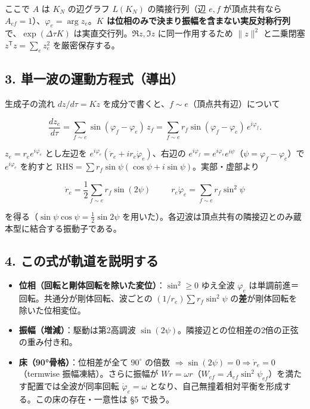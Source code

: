 \documentclass[
  a4paper,
]{ltjsarticle}
\providecommand{\tightlist}{%
  \setlength{\itemsep}{0pt}\setlength{\parskip}{0pt}}
\begin{document}
ここで \(A\) は \(K_N\) の辺グラフ \(L(K_N)\) の隣接行列（辺 \(e,f\)
が頂点共有なら \(A_{ef}=1\)）、\(\varphi_e=\arg z_e\)。\textbf{\(K\)
は位相のみで決まり振幅を含まない実反対称行列}で、\(\exp(\Delta\tau K)\)
は実直交行列。\(\Re z,\Im z\) に同一作用するため \(\|z\|^2\) と二乗閉塞
\(z^{\mathsf T}z=\sum_e z_e^2\) を厳密保存する。

\subsection{3.
単一波の運動方程式（導出）}\label{ux5358ux4e00ux6ce2ux306eux904bux52d5ux65b9ux7a0bux5f0fux5c0eux51fa}

生成子の流れ \(dz/d\tau=Kz\)
を成分で書くと、\(f\sim e\)（頂点共有辺）について

\[\frac{dz_e}{d\tau}=\sum_{f\sim e}\sin(\varphi_f-\varphi_e)\,z_f=\sum_{f\sim e}r_f\sin(\varphi_f-\varphi_e)\,e^{i\varphi_f}.\]

\(z_e=r_e e^{i\varphi_e}\) とし左辺を
\(e^{i\varphi_e}(\dot r_e+ir_e\dot\varphi_e)\)、右辺の
\(e^{i\varphi_f}=e^{i\varphi_e}e^{i\psi}\)（\(\psi=\varphi_f-\varphi_e\)）で
\(e^{i\varphi_e}\) を約すと
\(\text{RHS}=\sum r_f\sin\psi(\cos\psi+i\sin\psi)\)。実部・虚部より

\[\boxed{\ \dot r_e=\frac12\sum_{f\sim e}r_f\sin(2\psi)\ }\qquad\boxed{\ r_e\dot\varphi_e=\sum_{f\sim e}r_f\sin^2\psi\ }\]

を得る（\(\sin\psi\cos\psi=\tfrac12\sin2\psi\)
を用いた）。各辺波は頂点共有の隣接辺とのみ蔵本型に結合する振動子である。

\subsection{4.
この式が軌道を説明する}\label{ux3053ux306eux5f0fux304cux8eccux9053ux3092ux8aacux660eux3059ux308b}

\begin{itemize}
\tightlist
\item
  \textbf{位相（回転と剛体回転を除いた変位）}：\(\sin^2\ge0\) ゆえ全波
  \(\varphi_e\) は単調前進＝回転。共通分が剛体回転、波ごとの
  \((1/r_e)\sum r_f\sin^2\psi\)
  の\textbf{差}が剛体回転を除いた位相変位。
\item
  \textbf{振幅（増減）}：駆動は第2高調波
  \(\sin(2\psi)\)。隣接辺との位相差の2倍の正弦の重み付き和。
\item
  \textbf{床（90°骨格）}：位相差が全て \(90^\circ\) の倍数
  \(\Rightarrow\sin(2\psi)=0\Rightarrow\dot r_e=0\)（termwise
  振幅凍結）。さらに振幅が
  \(Wr=\omega r\)（\(W_{ef}=A_{ef}\sin^2\psi_{ef}\)）を満たす配置では全波が同率回転
  \(\dot\varphi_e=\omega\)
  となり、自己無撞着相対平衡を形成する。この床の存在・一意性は §5
  で扱う。
\end{itemize}
\end{document}
